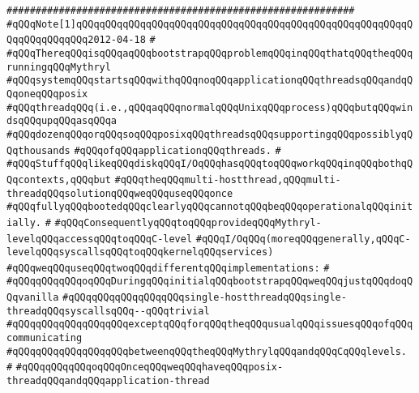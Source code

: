 \verb|############################################################|\newline
\verb|#qQQqNote[1]qQQqqQQqqQQqqQQqqQQqqQQqqQQqqQQqqQQqqQQqqQQqqQQqqQQqqQQqqQQqqQQqqQQqqQQq2012-04-18|\newline
\verb|#|\newline
\verb|#qQQqThereqQQqisqQQqaqQQqbootstrapqQQqproblemqQQqinqQQqthatqQQqtheqQQqrunningqQQqMythryl|\newline
\verb|#qQQqsystemqQQqstartsqQQqwithqQQqnoqQQqapplicationqQQqthreadsqQQqandqQQqoneqQQqposix|\newline
\verb|#qQQqthreadqQQq(i.e.,qQQqaqQQqnormalqQQqUnixqQQqprocess)qQQqbutqQQqwindsqQQqupqQQqasqQQqa|\newline
\verb|#qQQqdozenqQQqorqQQqsoqQQqposixqQQqthreadsqQQqsupportingqQQqpossiblyqQQqthousands|\newline
\verb|#qQQqofqQQqapplicationqQQqthreads.|\newline
\verb|#|\newline
\verb|#qQQqStuffqQQqlikeqQQqdiskqQQqI/OqQQqhasqQQqtoqQQqworkqQQqinqQQqbothqQQqcontexts,qQQqbut|\newline
\verb|#qQQqtheqQQqmulti-hostthread,qQQqmulti-threadqQQqsolutionqQQqweqQQquseqQQqonce|\newline
\verb|#qQQqfullyqQQqbootedqQQqclearlyqQQqcannotqQQqbeqQQqoperationalqQQqinitially.|\newline
\verb|#|\newline
\verb|#qQQqConsequentlyqQQqtoqQQqprovideqQQqMythryl-levelqQQqaccessqQQqtoqQQqC-level|\newline
\verb|#qQQqI/OqQQq(moreqQQqgenerally,qQQqC-levelqQQqsyscallsqQQqtoqQQqkernelqQQqservices)|\newline
\verb|#qQQqweqQQquseqQQqtwoqQQqdifferentqQQqimplementations:|\newline
\verb|#|\newline
\verb|#qQQqqQQqqQQqoqQQqDuringqQQqinitialqQQqbootstrapqQQqweqQQqjustqQQqdoqQQqvanilla|\newline
\verb|#qQQqqQQqqQQqqQQqqQQqsingle-hostthreadqQQqsingle-threadqQQqsyscallsqQQq--qQQqtrivial|\newline
\verb|#qQQqqQQqqQQqqQQqqQQqexceptqQQqforqQQqtheqQQqusualqQQqissuesqQQqofqQQqcommunicating|\newline
\verb|#qQQqqQQqqQQqqQQqqQQqbetweenqQQqtheqQQqMythrylqQQqandqQQqCqQQqlevels.|\newline
\verb|#|\newline
\verb|#qQQqqQQqqQQqoqQQqOnceqQQqweqQQqhaveqQQqposix-threadqQQqandqQQqapplication-thread|\newline
